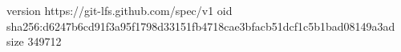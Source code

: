 version https://git-lfs.github.com/spec/v1
oid sha256:d6247b6cd91f3a95f1798d33151fb4718cae3bfacb51dcf1c5b1bad08149a3ad
size 349712
